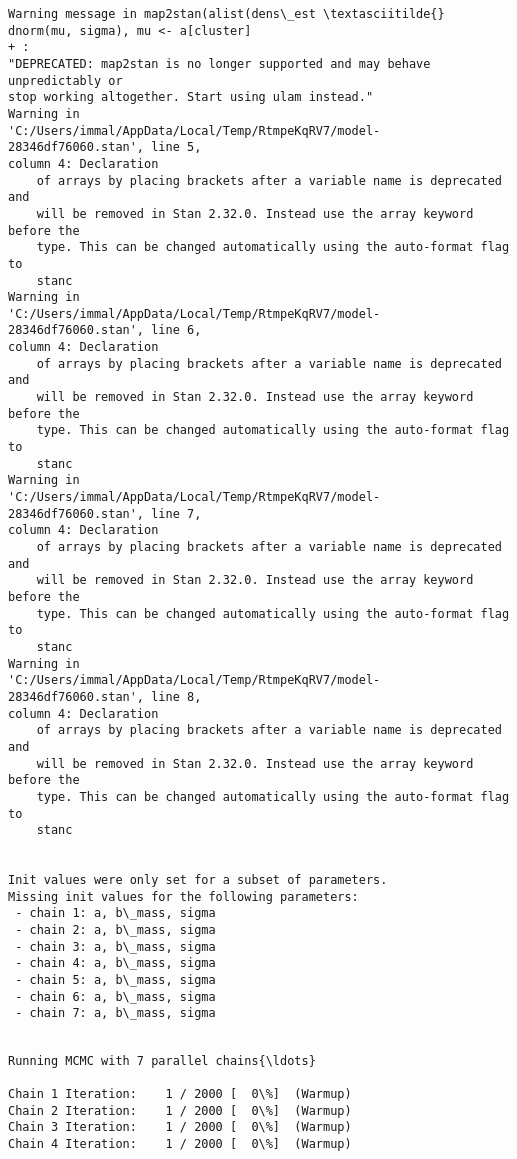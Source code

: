 \documentclass[11pt]{article}
\begin{document}
    \begin{Verbatim}[commandchars=\\\{\}]
Warning message in map2stan(alist(dens\_est \textasciitilde{} dnorm(mu, sigma), mu <- a[cluster]
+ :
"DEPRECATED: map2stan is no longer supported and may behave unpredictably or
stop working altogether. Start using ulam instead."
Warning in
'C:/Users/immal/AppData/Local/Temp/RtmpeKqRV7/model-28346df76060.stan', line 5,
column 4: Declaration
    of arrays by placing brackets after a variable name is deprecated and
    will be removed in Stan 2.32.0. Instead use the array keyword before the
    type. This can be changed automatically using the auto-format flag to
    stanc
Warning in
'C:/Users/immal/AppData/Local/Temp/RtmpeKqRV7/model-28346df76060.stan', line 6,
column 4: Declaration
    of arrays by placing brackets after a variable name is deprecated and
    will be removed in Stan 2.32.0. Instead use the array keyword before the
    type. This can be changed automatically using the auto-format flag to
    stanc
Warning in
'C:/Users/immal/AppData/Local/Temp/RtmpeKqRV7/model-28346df76060.stan', line 7,
column 4: Declaration
    of arrays by placing brackets after a variable name is deprecated and
    will be removed in Stan 2.32.0. Instead use the array keyword before the
    type. This can be changed automatically using the auto-format flag to
    stanc
Warning in
'C:/Users/immal/AppData/Local/Temp/RtmpeKqRV7/model-28346df76060.stan', line 8,
column 4: Declaration
    of arrays by placing brackets after a variable name is deprecated and
    will be removed in Stan 2.32.0. Instead use the array keyword before the
    type. This can be changed automatically using the auto-format flag to
    stanc


Init values were only set for a subset of parameters.
Missing init values for the following parameters:
 - chain 1: a, b\_mass, sigma
 - chain 2: a, b\_mass, sigma
 - chain 3: a, b\_mass, sigma
 - chain 4: a, b\_mass, sigma
 - chain 5: a, b\_mass, sigma
 - chain 6: a, b\_mass, sigma
 - chain 7: a, b\_mass, sigma


    \end{Verbatim}

    \begin{Verbatim}[commandchars=\\\{\}]
Running MCMC with 7 parallel chains{\ldots}

Chain 1 Iteration:    1 / 2000 [  0\%]  (Warmup)
Chain 2 Iteration:    1 / 2000 [  0\%]  (Warmup)
Chain 3 Iteration:    1 / 2000 [  0\%]  (Warmup)
Chain 4 Iteration:    1 / 2000 [  0\%]  (Warmup)
    \end{Verbatim}
\end{document}
